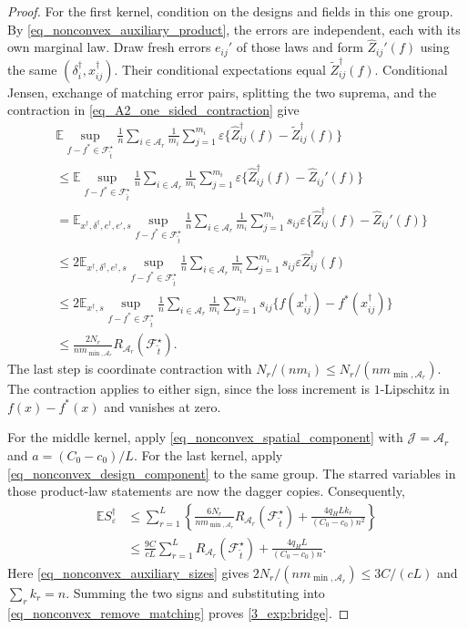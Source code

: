 \documentclass[twoside,11pt]{article}
\newenvironment{revision}{\color{revisionred}}{}
\begin{document}
\begin{revision}
\begin{proof}
For the first kernel, condition on the designs and fields in this
one group. By \eqref{eq_nonconvex_auxiliary_product}, the errors
are independent, each with its own marginal law.
Draw fresh errors $e_{ij}'$ of those laws and form
$\hat Z_{ij}'(f)$ using the same $(\delta_i^\dagger,x_{ij}^\dagger)$.
Their conditional expectations equal $\tilde Z_{ij}^\dagger(f)$.
Conditional Jensen, exchange of matching error pairs, splitting
the two suprema, and the contraction in
\eqref{eq_A2_one_sided_contraction} give
\begin{align*}
&\mathbb E\sup_{f-f^*\in\mathcal F_{\tilde t}^{\star}}
\frac1n\sum_{i\in\mathcal A_r}\frac1{m_i}\sum_{j=1}^{m_i}
\varepsilon\{\hat Z_{ij}^\dagger(f)-\tilde Z_{ij}^\dagger(f)\}\\
&\leq\mathbb E\sup_{f-f^*\in\mathcal F_{\tilde t}^{\star}}
\frac1n\sum_{i\in\mathcal A_r}\frac1{m_i}\sum_{j=1}^{m_i}
\varepsilon\{\hat Z_{ij}^\dagger(f)-\hat Z_{ij}'(f)\}\\
&=\mathbb E_{x^\dagger,\delta^\dagger,e^\dagger,e',s}
\sup_{f-f^*\in\mathcal F_{\tilde t}^{\star}}
\frac1n\sum_{i\in\mathcal A_r}\frac1{m_i}\sum_{j=1}^{m_i}
s_{ij}\varepsilon\{\hat Z_{ij}^\dagger(f)-\hat Z_{ij}'(f)\}\\
&\leq2\mathbb E_{x^\dagger,\delta^\dagger,e^\dagger,s}
\sup_{f-f^*\in\mathcal F_{\tilde t}^{\star}}
\frac1n\sum_{i\in\mathcal A_r}\frac1{m_i}\sum_{j=1}^{m_i}
s_{ij}\varepsilon\hat Z_{ij}^\dagger(f)\\
&\leq2\mathbb E_{x^\dagger,s}
\sup_{f-f^*\in\mathcal F_{\tilde t}^{\star}}
\frac1n\sum_{i\in\mathcal A_r}\frac1{m_i}\sum_{j=1}^{m_i}
s_{ij}\{f(x_{ij}^\dagger)-f^*(x_{ij}^\dagger)\}\\
&\leq\frac{2N_r}{n m_{\min,\mathcal A_r}}
                 R_{\mathcal A_r}(\mathcal F_{\tilde t}^{\star}).
\end{align*}
The last step is coordinate contraction with
$N_r/(nm_i)\leq N_r/(n m_{\min,\mathcal A_r})$.
The contraction applies to either sign, since the loss increment
is $1$-Lipschitz in $f(x)-f^*(x)$ and vanishes at zero.

For the middle kernel, apply
\eqref{eq_nonconvex_spatial_component} with
$\mathcal J=\mathcal A_r$ and $a=(C_0-c_0)/L$.
For the last kernel, apply
\eqref{eq_nonconvex_design_component} to the same group.
The starred variables in those product-law statements are now
the dagger copies. Consequently,
\begin{align*}
\mathbb E S_\varepsilon^\dagger
&\leq\sum_{r=1}^L
\left\{\frac{6N_r}{n m_{\min,\mathcal A_r}}
R_{\mathcal A_r}(\mathcal F_{\tilde t}^{\star})
+\frac{4q_H Lk_r}{(C_0-c_0)n^2}\right\}\\
&\leq\frac{9C}{cL}\sum_{r=1}^L
R_{\mathcal A_r}(\mathcal F_{\tilde t}^{\star})
+\frac{4q_H L}{(C_0-c_0)n}.
\end{align*}
Here \eqref{eq_nonconvex_auxiliary_sizes} gives
$2N_r/(nm_{\min,\mathcal A_r})\leq3C/(cL)$ and
$\sum_r k_r=n$. Summing the two signs and substituting into
\eqref{eq_nonconvex_remove_matching} proves \eqref{3_exp:bridge}.


\end{proof}
\end{revision}
\end{document}

